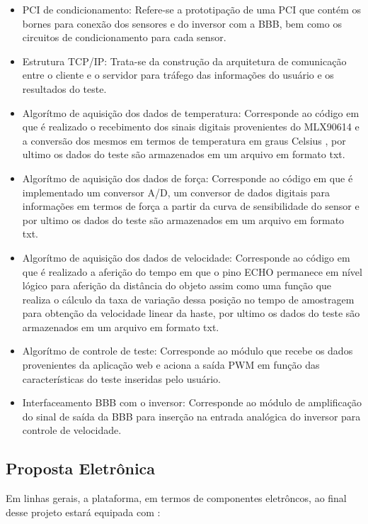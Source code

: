 	\begin{itemize}

		\item PCI de condicionamento: Refere-se a prototipação de uma PCI que contém os bornes para conexão dos sensores e do inversor com a BBB, bem como os circuitos de condicionamento para cada sensor.
		\item Estrutura TCP/IP: Trata-se da construção da arquitetura de comunicação entre o cliente e o servidor para tráfego das informações do usuário e os resultados do teste.
		\item Algorítmo de aquisição dos dados de temperatura: Corresponde ao código em que é realizado o recebimento dos sinais digitais provenientes do MLX90614 e a conversão dos mesmos em termos de temperatura em graus Celsius , por ultimo os dados do teste são armazenados em um arquivo em formato txt.
		\item Algorítmo de aquisição dos dados de força: Corresponde ao código em que é implementado um conversor A/D, um conversor de dados digitais para informações em termos de força a partir da curva de sensibilidade do sensor e por ultimo os dados do teste são armazenados em um arquivo em formato txt.
		\item Algorítmo de aquisição dos dados de velocidade: Corresponde ao código em que é realizado a aferição do tempo em que o pino ECHO permanece em nível lógico para aferição da distância do objeto assim como uma função que realiza o cálculo da taxa de variação dessa posição no tempo de amostragem para obtenção da velocidade linear da haste, por ultimo os dados do teste são armazenados em um arquivo em formato txt.
		\item Algorítmo de controle de teste: Corresponde ao módulo que recebe os dados provenientes da aplicação web e aciona a saída PWM em função das características do teste inseridas pelo usuário.
		\item Interfaceamento BBB com o inversor: Corresponde ao módulo de amplificação do sinal de saída da BBB para inserção na entrada analógica do inversor para controle de velocidade.
	\end{itemize}


\subsection{Proposta Eletrônica}

	Em linhas gerais, a plataforma, em termos de componentes eletrôncos, ao final desse projeto estará equipada com :

